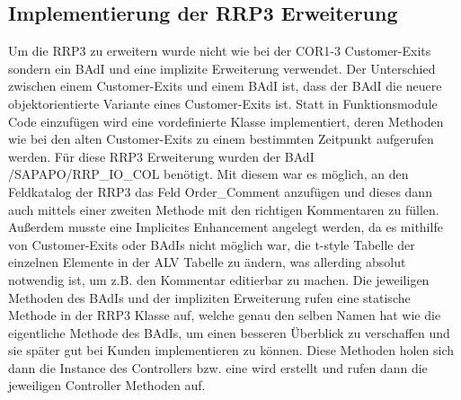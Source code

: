 \subsection{Implementierung der RRP3 Erweiterung}
\label{sec:Implementierung der RRP3 Erweiterung}   
Um die RRP3 zu erweitern wurde nicht wie bei der COR1-3 Customer-Exits sondern ein \ac{BAdI} und eine implizite Erweiterung verwendet. Der Unterschied zwischen einem Customer-Exits und einem \ac{BAdI} ist, dass der \ac{BAdI} die neuere objektorientierte Variante eines Customer-Exits ist. Statt in Funktionsmodule Code einzufügen wird eine vordefinierte Klasse implementiert, deren Methoden wie bei den alten Customer-Exits zu einem bestimmten Zeitpunkt aufgerufen werden. Für diese RRP3 Erweiterung wurden der \ac{BAdI} /SAPAPO/RRP\_IO\_COL benötigt. Mit diesem war es möglich, an den Feldkatalog der RRP3 das Feld Order\_Comment anzufügen und dieses dann auch mittels einer zweiten Methode mit den richtigen Kommentaren zu füllen. Außerdem musste eine Implicites Enhancement angelegt werden, da es mithilfe von Customer-Exits oder \ac{BAdI}s nicht möglich war, die t-style Tabelle der einzelnen Elemente in der \ac{ALV} Tabelle zu ändern, was allerding absolut notwendig ist, um z.B. den Kommentar editierbar zu machen. Die jeweiligen Methoden des \ac{BAdI}s und der impliziten Erweiterung rufen eine statische Methode in der RRP3 Klasse auf, welche genau den selben Namen hat wie die eigentliche Methode des \ac{BAdI}s, um einen besseren Überblick zu verschaffen und sie später gut bei Kunden implementieren zu können. Diese Methoden holen sich dann die Instance des Controllers bzw. eine wird erstellt und rufen dann die jeweiligen Controller Methoden auf.

